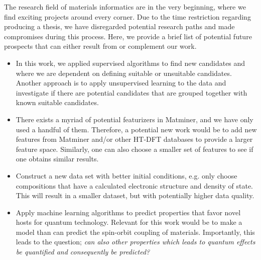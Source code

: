 The research field of materials informatics are in the very beginning, where we find exciting projects around every corner.
Due to the time restriction regarding producing a thesis, we have  disregarded potential research paths and made compromises during this process. Here, we provide a brief list of potential future prospects that can either result from or complement our work.
\begin{itemize}
  \item In this work, we applied supervised algorithms to find new candidates and where we are dependent on defining suitable or unsuitable candidates. Another approach is to apply unsupervised learning to the data and investigate if there are potential candidates that are grouped together with known suitable candidates.
  \item There exists a myriad of potential featurizers in Matminer, and we have only used a handful of them. Therefore, a potential new work would be to add new features from Matminer and/or other HT-DFT databases to provide a larger feature space. Similarly, one can also choose a smaller set of features to see if one obtains similar results.
  \item Construct a new data set with better initial conditions, e.g. only choose compositions that have a calculated electronic structure and density of state. This will result in a smaller dataset, but with potentially higher data quality.
  \item Apply machine learning algorithms to predict properties that favor novel hosts for quantum technology. Relevant for this work would be to make a model than can predict the spin-orbit coupling of materials. Importantly, this leads to the question; \textit{can also other properties which leads to quantum effects be quantified and consequently be predicted?}
\end{itemize}


